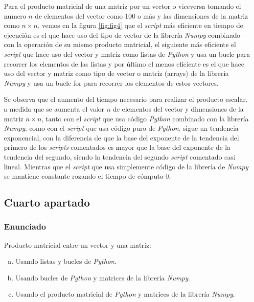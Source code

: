 \documentclass[12pt,twoside]{article}
\begin{document}
Para el producto matricial de una matriz por un vector o viceversa tomando el numero $n$ de elementos del vector como 100 o más y las dimensiones de la matriz como $n \times n$, vemos en la figura \ref{fig:fig4} que el \textit{script} más eficiente en tiempo de ejecución es el que hace uso del tipo de vector de la librería \textit{Numpy} combinado con la operación de su mismo producto matricial, el siguiente más eficiente el \textit{script} que hace uso del vector y matriz como listas de \textit{Python} y usa un bucle para recorrer los elementos de las listas y por último el menos eficiente es el que hace uso del vector y matriz como tipo de vector o matriz (arrays) de la librería \textit{Numpy} y usa un bucle for para recorrer los elementos de estos vectores.

Se observa que el aumento del tiempo necesario para realizar el producto escalar, a medida que se aumenta el valor $n$ de elementos del vector y dimensiones de la matriz $n \times n$, tanto con el \textit{script} que usa código \textit{Python} combinado con la librería \textit{Numpy}, como con el \textit{script} que usa código puro de \textit{Python}, sigue un tendencia exponencial, con la diferencia de que la base del exponente de la tendencia del primero de los \textit{scripts} comentados es mayor que la base del exponente de la tendencia del segundo, siendo la tendencia del segundo \textit{script} comentado casi lineal. Mientras que el \textit{script} que usa simplemente código de la librería de \textit{Numpy} se mantiene constante rozando el tiempo de cómputo 0.

\subsection{Cuarto apartado}

\subsubsection{Enunciado}

\noindent
Producto matricial entre un vector y una matriz:

\begin{enumerate}[(a)]

\item Usando listas y bucles de \textit{Python}.

\item Usando bucles de \textit{Python} y matrices de la librería \textit{Numpy}.

\item Usando el producto matricial de \textit{Python} y matrices de la librería \textit{Numpy}.

\end{enumerate}
\end{document}
